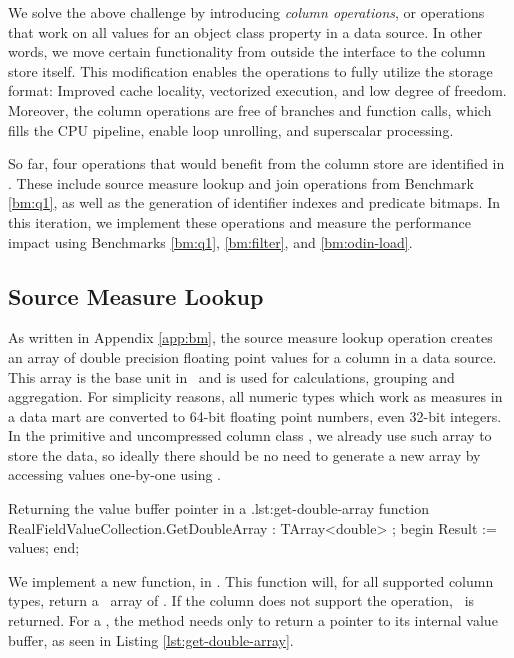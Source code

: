 We solve the above challenge by introducing \textit{column operations}, or operations that work on all values for an object class property in a data source. In other words, we move certain functionality from outside the  interface to the column store itself. This modification enables the operations to fully utilize the storage format: Improved cache locality, vectorized execution, and low degree of freedom. Moreover, the column operations are free of branches and function calls, which fills the CPU pipeline, enable loop unrolling, and superscalar processing.

So far, four operations that would benefit from the column store are identified in \gap. These include source measure lookup and join operations from Benchmark \ref{bm:q1}, as well as the generation of identifier indexes and predicate bitmaps. In this iteration, we implement these operations and measure the performance impact using Benchmarks \ref{bm:q1}, \ref{bm:filter}, and \ref{bm:odin-load}.





\subsection{Source Measure Lookup}
\label{sub:Source Measure Lookup}
As written in Appendix \ref{app:bm}, the source measure lookup operation creates an array of double precision floating point values for a column in a data source. This array is the base unit in \gd~and is used for calculations, grouping and aggregation. For simplicity reasons, all numeric types which work as measures in a data mart are converted to 64-bit floating point numbers, even 32-bit integers. In the primitive and uncompressed column class , we already use such array to store the data, so ideally there should be no need to generate a new array by accessing values one-by-one using .


\begin{delphicode}{Returning the value buffer pointer in a .}{lst:get-double-array}
function RealFieldValueCollection.GetDoubleArray
: TArray<double> ;
begin
  Result := values;
end;
\end{delphicode}
We implement a new function,  in . This function will, for all supported column types, return a \delphi~array of . If the column does not support the operation, \nil~is returned. For a , the method needs only to return a pointer to its internal value buffer, as seen in Listing \ref{lst:get-double-array}.

